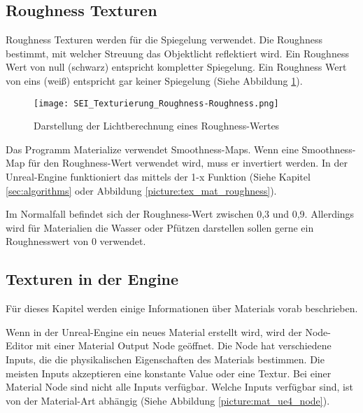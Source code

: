 \subsection{Roughness Texturen}
\label{sec:tex_roughness}

Roughness Texturen werden für die Spiegelung verwendet. Die Roughness bestimmt, mit welcher Streuung das Objektlicht
reflektiert wird. Ein Roughness Wert von null (schwarz) entspricht kompletter Spiegelung. Ein Roughness Wert von eins
(weiß) entspricht gar keiner Spiegelung (Siehe Abbildung \ref{picture:roughness_illustration}).

\begin{figure}[H]
    \centering
    \texttt{[image: SEI\_Texturierung\_Roughness-Roughness.png]}
    \caption{Darstellung der Lichtberechnung eines Roughness-Wertes}
    \label{picture:roughness_illustration}
\end{figure}


Das Programm Materialize verwendet Smoothness-Maps. Wenn eine Smoothness-Map für den Roughness-Wert verwendet wird,
muss er invertiert werden. In der Unreal-Engine funktioniert das mittels der 1-x Funktion (Siehe
Kapitel \ref{sec:algorithms} oder Abbildung \ref{picture:tex_mat_roughness}).

Im Normalfall befindet sich der Roughness-Wert zwischen 0,3 und 0,9. Allerdings wird für Materialien die Wasser oder
Pfützen darstellen sollen gerne ein Roughnesswert von 0 verwendet.

\subsection{Texturen in der Engine}
\label{sec:tex_inside_engine}

Für dieses Kapitel werden einige Informationen über Materials vorab beschrieben.


Wenn in der Unreal-Engine ein neues Material erstellt wird, wird der Node-Editor\citep{ue:node_introduction} mit einer
Material Output Node geöffnet. Die Node hat verschiedene Inputs, die die physikalischen Eigenschaften des Materials
bestimmen. Die meisten Inputs akzeptieren eine konstante Value oder eine Textur. Bei einer Material Node sind nicht
alle Inputs verfügbar. Welche Inputs verfügbar sind, ist von der Material-Art abhängig (Siehe
Abbildung \ref{picture:mat_ue4_node}).

